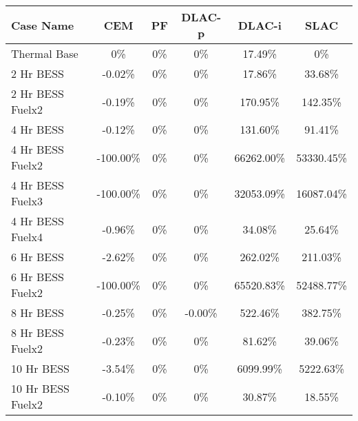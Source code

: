 \begin{tabular}{lccccc}
\toprule
Case Name & CEM & PF & DLAC-p & DLAC-i & SLAC \\
\midrule
Thermal Base & 0\% & 0\% & 0\% & 17.49\% & 0\% \\
2 Hr BESS & -0.02\% & 0\% & 0\% & 17.86\% & 33.68\% \\
2 Hr BESS Fuelx2 & -0.19\% & 0\% & 0\% & 170.95\% & 142.35\% \\
4 Hr BESS & -0.12\% & 0\% & 0\% & 131.60\% & 91.41\% \\
4 Hr BESS Fuelx2 & -100.00\% & 0\% & 0\% & 66262.00\% & 53330.45\% \\
4 Hr BESS Fuelx3 & -100.00\% & 0\% & 0\% & 32053.09\% & 16087.04\% \\
4 Hr BESS Fuelx4 & -0.96\% & 0\% & 0\% & 34.08\% & 25.64\% \\
6 Hr BESS & -2.62\% & 0\% & 0\% & 262.02\% & 211.03\% \\
6 Hr BESS Fuelx2 & -100.00\% & 0\% & 0\% & 65520.83\% & 52488.77\% \\
8 Hr BESS & -0.25\% & 0\% & -0.00\% & 522.46\% & 382.75\% \\
8 Hr BESS Fuelx2 & -0.23\% & 0\% & 0\% & 81.62\% & 39.06\% \\
10 Hr BESS & -3.54\% & 0\% & 0\% & 6099.99\% & 5222.63\% \\
10 Hr BESS Fuelx2 & -0.10\% & 0\% & 0\% & 30.87\% & 18.55\% \\
\bottomrule
\end{tabular}
